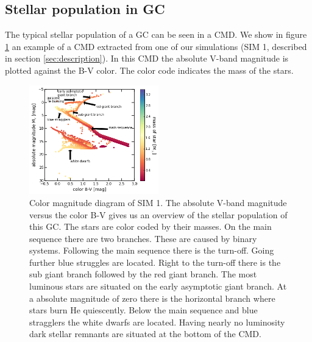 \subsection{Stellar population in GC}\label{sec:cmd_theory}
The typical stellar population of a \ac{GC} can be seen in a \ac{CMD}. We show in figure \ref{fig:cmd} an example of a \ac{CMD} extracted from one of our simulations (SIM 1, described in section \ref{sec:description}). In this \ac{CMD} the absolute V-band magnitude is plotted against the B-V color. The color code indicates the mass of the stars. 
\begin{figure}[htbp]
\centering
	\includegraphics[width=0.5\textwidth]{Plots/color_magnitude_diagram.png}
	\caption{Color magnitude diagram of SIM 1. The absolute V-band magnitude versus the color B-V gives us an overview of the stellar population of this \ac{GC}. The stars are color coded by their masses. On the main sequence there are two branches. These are caused by binary systems. Following the main sequence there is the turn-off. Going further blue struggles are located. Right to the turn-off there is the sub giant branch followed by the red giant branch. The most luminous stars are situated on the early asymptotic giant branch. At a absolute magnitude of zero there is the horizontal branch where stars burn He quiescently. Below  the main sequence and blue stragglers the white dwarfs are located. Having nearly no luminosity dark stellar remnants are situated at the bottom of the \ac{CMD}.}
	\label{fig:cmd}
\end{figure}
